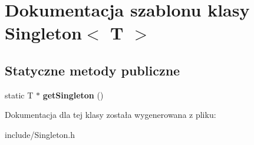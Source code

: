 \hypertarget{class_singleton}{\section{Dokumentacja szablonu klasy Singleton$<$ T $>$}
\label{class_singleton}
}
\subsection*{Statyczne metody publiczne}
\begin{DoxyCompactItemize}
\item 
\hypertarget{class_singleton_aac3d56c39edc2b596260b787f9aef758}{static T $\ast$ {\bfseries get\-Singleton} ()}\label{class_singleton_aac3d56c39edc2b596260b787f9aef758}

\end{DoxyCompactItemize}


Dokumentacja dla tej klasy została wygenerowana z pliku\-:\begin{DoxyCompactItemize}
\item 
include/Singleton.\-h\end{DoxyCompactItemize}
